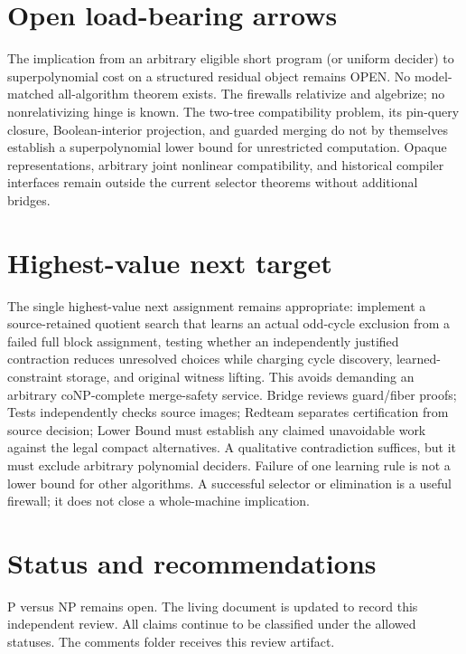 \documentclass[11pt]{article}
\begin{document}
\section{Open load-bearing arrows}
The implication from an arbitrary eligible short program (or uniform decider) to superpolynomial cost on a structured residual object remains OPEN. No model-matched all-algorithm theorem exists. The firewalls relativize and algebrize; no nonrelativizing hinge is known. The two-tree compatibility problem, its pin-query closure, Boolean-interior projection, and guarded merging do not by themselves establish a superpolynomial lower bound for unrestricted computation. Opaque representations, arbitrary joint nonlinear compatibility, and historical compiler interfaces remain outside the current selector theorems without additional bridges.

\section{Highest-value next target}
The single highest-value next assignment remains appropriate: implement a source-retained quotient search that learns an actual odd-cycle exclusion from a failed full block assignment, testing whether an independently justified contraction reduces unresolved choices while charging cycle discovery, learned-constraint storage, and original witness lifting. This avoids demanding an arbitrary coNP-complete merge-safety service. Bridge reviews guard/fiber proofs; Tests independently checks source images; Redteam separates certification from source decision; Lower Bound must establish any claimed unavoidable work against the legal compact alternatives. A qualitative contradiction suffices, but it must exclude arbitrary polynomial deciders. Failure of one learning rule is not a lower bound for other algorithms. A successful selector or elimination is a useful firewall; it does not close a whole-machine implication.

\section{Status and recommendations}
P versus NP remains open. The living document is updated to record this independent review. All claims continue to be classified under the allowed statuses. The comments folder receives this review artifact.

\end{document}
